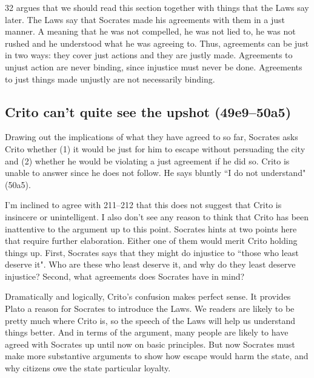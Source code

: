 \documentclass[11pt]{article}
\begin{document}
\citet{kraut1984} 32 argues that we should read this section together with
things that the Laws say later.  The Laws say that Socrates made his
agreements with them in a just manner.  A  meaning that
he was not compelled, he was not lied to, he was not rushed and he
understood what he was agreeing to.  Thus, agreements can be just in two
ways: they cover just actions and they are justly made.  Agreements to
unjust action are never binding, since injustice must never be done.
Agreements to just things made unjustly are not necessarily binding.


\subsection{Crito can't quite see the upshot (49e9--50a5)}

Drawing out the implications of what they have agreed to so far, Socrates
asks Crito whether (1) it would be just for him to escape without
persuading the city and (2) whether he would be violating a just agreement
if he did so.  Crito is unable to answer since he does not follow.  He says
bluntly ``I do not understand" (50a5).

I'm inclined to agree with \citet{brickhouse2004} 211--212 that this does
not suggest that Crito is insincere or unintelligent.  I also don't see any
reason to think that Crito has been inattentive to the argument up to this
point.  Socrates hints at two points here that require further elaboration.
Either one of them would merit Crito holding things up.  First, Socrates
says that they might do injustice to ``those who least deserve it". Who are
these who least deserve it, and why do they least deserve injustice?
Second, what agreements does Socrates have in mind?

Dramatically and logically, Crito's confusion makes perfect sense.  It
provides Plato a reason for Socrates to introduce the Laws.  We readers are
likely to be pretty much where Crito is, so the speech of the Laws will
help us understand things better.  And in terms of the argument, many
people are likely to have agreed with Socrates up until now on basic
principles.  But now Socrates must make more substantive arguments to show
how escape would harm the state, and why citizens owe the state particular
loyalty.

\end{document}
